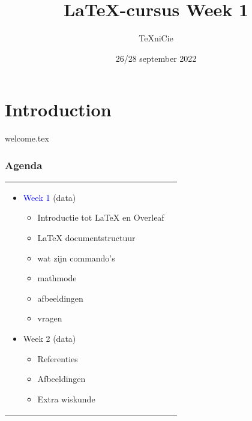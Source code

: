 \documentclass[allauthors,dutch]{../../../cursuspresentatie}
\title{\LaTeX{}-cursus Week 1}
\author{\TeX niCie}
\date{26/28 september 2022}
\def\importslide#1#2{%
	{#2}
}
\begin{document}
\section{Introduction}
\importslide{beginners}{welcome.tex}

\begin{frame}
	\frametitle{Agenda}

	\begin{tabular}{p{6cm} p{7cm}}
	\begin{itemize}
		\item \textcolor{blue}{Week 1} (data)
	\begin{itemize}[label=\textbullet]
		\item Introductie tot LaTeX en Overleaf
		\item LaTeX documentstructuur
		\item wat zijn commando's
		\item mathmode
		\item afbeeldingen
		\item vragen
	\end{itemize}
		\item Week 2 (data)
	\begin{itemize}[label=\textbullet]
		\item Referenties
		\item Afbeeldingen
		\item Extra wiskunde
	\end{itemize}
	\end{itemize}
		&

\end{tabular}
\end{frame}
\end{document}
